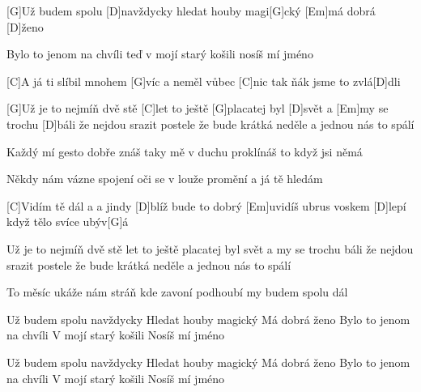 

[G]Už budem spolu [D]navždycky
hledat houby magi[G]cký
[Em]má dobrá [D]\null ženo

Bylo to jenom na chvíli
teď v mojí starý košili
nosíš mí jméno

[C]A já ti slíbil mnohem [G]víc
a neměl vůbec [C]nic
tak ňák jsme to zvlá[D]dli

[G]Už je to nejmíň dvě stě [C]let
to ještě [G]placatej byl [D]svět
a [Em]my se trochu [D]báli
že nejdou srazit postele
že bude krátká neděle
a jednou nás to spálí

Každý mí gesto dobře znáš
taky mě v duchu proklínáš
to když jsi němá 

Někdy nám vázne spojení
oči se v louže promění 
a já tě hledám
\slpc

[C]Vidím tě dál a a jindy [D]blíž
bude to dobrý [Em]uvidíš
ubrus voskem [D]lepí 
když tělo svíce ubýv[G]\null á 

Už je to nejmíň dvě stě let
to ještě placatej byl svět
a my se trochu báli
že nejdou srazit postele
že bude krátká neděle
a jednou nás to spálí

To měsíc ukáže nám stráň 
kde zavoní podhoubí
my budem spolu dál

Už budem spolu navždycky 
Hledat houby magický
Má dobrá ženo
Bylo to jenom na chvíli 
V mojí starý košili 
Nosíš mí jméno

Už budem spolu navždycky 
Hledat houby magický
Má dobrá ženo
Bylo to jenom na chvíli 
V mojí starý košili 
Nosíš mí jméno


